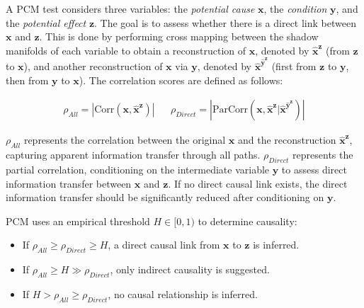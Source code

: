 A PCM test considers three variables: the \textit{potential cause} $\textbf{x}$, the \textit{condition} $\textbf{y}$, and the \textit{potential effect} $\textbf{z}$. The goal is to assess whether there is a direct link between $\textbf{x}$ and $\textbf{z}$. This is done by performing cross mapping between the shadow manifolds of each variable to obtain a reconstruction of $\textbf{x}$, denoted by $\hat{\textbf{x}}^{\textbf{z}}$ (from $\textbf{z}$ to $\textbf{x}$), and another reconstruction of $\textbf{x}$ via $\textbf{y}$, denoted by $\hat{\textbf{x}}^{\hat{\textbf{y}}^{\textbf{z}}}$ (first from $\textbf{z}$ to $\textbf{y}$, then from $\textbf{y}$ to $\textbf{x}$). The correlation scores are defined as follows:

\begin{align}
    \rho_{All}=\left| \text{Corr}(\textbf{x}, \hat{\textbf{x}}^{\textbf{z}}) \right|   &&    \rho_{Direct}=\left| \text{ParCorr}(\textbf{x}, \hat{\textbf{x}}^{\textbf{z}} | \hat{\textbf{x}}^{\hat{\textbf{y}}^{\textbf{z}}} ) \right|
\end{align}

$\rho_{All}$ represents the correlation between the original $\textbf{x}$ and the reconstruction $\hat{\textbf{x}}^{\textbf{z}}$, capturing apparent information transfer through all paths. $\rho_{Direct}$ represents the partial correlation, conditioning on the intermediate variable $\textbf{y}$ to assess direct information transfer between $\textbf{x}$ and $\textbf{z}$. If no direct causal link exists, the direct information transfer should be significantly reduced after conditioning on $\textbf{y}$.

PCM uses an empirical threshold $H \in [0, 1)$ to determine causality:
\begin{itemize}
    \item If $\rho_{All} \geq \rho_{Direct} \geq H$, a direct causal link from $\textbf{x}$ to $\textbf{z}$ is inferred.
    \item If $\rho_{All} \geq H \gg \rho_{Direct}$, only indirect causality is suggested.
    \item If $H > \rho_{All} \geq \rho_{Direct}$, no causal relationship is inferred.
\end{itemize}

